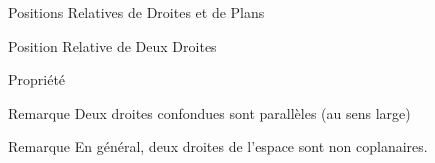 \documentclass{cours}
\begin{document}
\begin{Gpartie}{Positions Relatives de Droites et de Plans}
\begin{Spartie}{Position Relative de Deux Droites}
\begin{SSpartie}{Propriété}
\begin{center}
                    \parbox{\linewidth}{}
                \end{center}
            \end{SSpartie}
            \begin{SSpartie}{Remarque} 
                Deux droites confondues sont parallèles (au sens large)
            \end{SSpartie}
            \begin{SSpartie}{Remarque} 
                En général, deux droites de l'espace sont non coplanaires.
            \end{SSpartie}
        \end{Spartie}
    \end{Gpartie}
\end{document}
